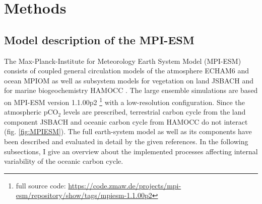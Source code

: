\documentclass[12pt]{article}
\begin{document}
\clearpage

\section{Methods}

\subsection{Model description of the MPI-ESM}

The Max-Planck-Institute for Meteorology Earth System Model (MPI-ESM) 
consists of coupled general circulation models of the atmosphere ECHAM6 \citep{Stevens2013} and ocean MPIOM \citep{Jungclaus2013} as well as subsystem models for vegetation on land JSBACH \citep{Reick2013} and for marine biogeochemistry HAMOCC \citep{Ilyina2013}. The large ensemble simulations are based on MPI-ESM version 1.1.00p2 \footnote[1]{full source code: \url{https://code.zmaw.de/projects/mpi-esm/repository/show/tags/mpiesm-1.1.00p2}} with a low-resolution configuration. Since the atmospheric pCO$_2$ levels are prescribed, terrestrial carbon cycle from the land component JSBACH and oceanic carbon cycle from HAMOCC do not interact (fig. \ref{fig:MPIESM}). The full earth-system model \citep{Giorgetta2013} as well as its components have been described and evaluated in detail by the given references. In the following subsections, I give an overview about the implemented processes affecting internal variability of the oceanic carbon cycle.



\end{document}
